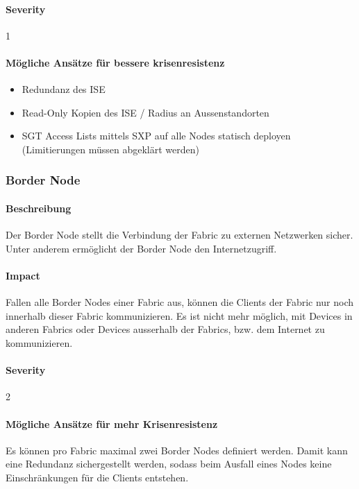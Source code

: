 \paragraph{Severity} 1

\paragraph{Mögliche Ansätze für bessere krisenresistenz}
\begin{itemize}
	\item Redundanz des ISE
	\item Read-Only Kopien des ISE / Radius an Aussenstandorten
	\item SGT Access Lists mittels SXP auf alle Nodes statisch deployen (Limitierungen müssen abgeklärt werden)
\end{itemize}

\subsubsection{Border Node}

\paragraph{Beschreibung}

Der Border Node stellt die Verbindung der Fabric zu externen Netzwerken sicher. Unter anderem ermöglicht der Border Node den Internetzugriff.

\paragraph{Impact}

Fallen alle Border Nodes einer Fabric aus, können die Clients der Fabric nur noch innerhalb dieser Fabric kommunizieren. Es ist nicht mehr möglich, mit Devices in anderen Fabrics oder Devices ausserhalb der Fabrics, bzw. dem Internet zu kommunizieren.

\paragraph{Severity} 2

\paragraph{Mögliche Ansätze für mehr Krisenresistenz}

Es können pro Fabric maximal zwei Border Nodes definiert werden. Damit kann eine Redundanz sichergestellt werden, sodass beim Ausfall eines Nodes keine Einschränkungen für die Clients entstehen. 

